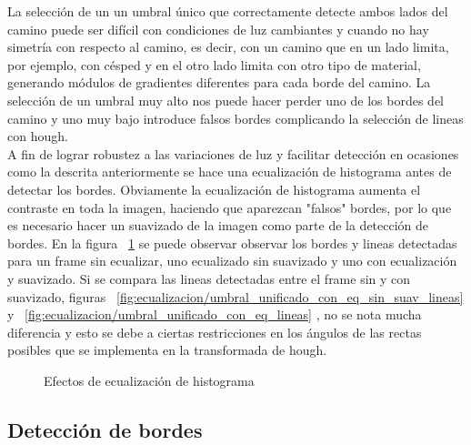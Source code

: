 \documentclass[a4paper,spanish]{article}
\begin{document}
	La selección de un un umbral único que correctamente detecte ambos lados del camino puede ser difícil con condiciones de luz cambiantes y cuando no hay simetría con respecto al camino, es decir, con un camino que en un lado limita, por ejemplo,  con césped y en el otro lado limita con otro tipo de material, generando módulos de gradientes diferentes para cada borde del camino. La selección de un umbral muy alto nos puede hacer perder uno de los bordes del camino y uno muy bajo introduce falsos bordes complicando la selección de lineas con hough. \\ 
	A fin de lograr robustez a las variaciones de luz y facilitar detección en ocasiones como la descrita anteriormente se hace una  ecualización de histograma antes de detectar los bordes.
    Obviamente la ecualización de histograma aumenta el contraste en toda la imagen, haciendo que aparezcan "falsos" bordes, por lo que es necesario hacer un suavizado de la imagen como parte de la detección de bordes. 
    En la figura ~\ref{fig:ecualizacion} se puede observar 
   observar los bordes y lineas detectadas para un frame sin ecualizar, uno ecualizado sin suavizado y uno con ecualización y suavizado. Si se compara las lineas detectadas entre el frame sin y con suavizado, figuras ~\ref{fig:ecualizacion/umbral_unificado_con_eq_sin_suav_lineas} y ~\ref{fig:ecualizacion/umbral_unificado_con_eq_lineas} , no se nota mucha diferencia y esto se debe a ciertas restricciones en los ángulos de las rectas posibles que se  implementa en la transformada de hough. 
    
\begin{figure}[H]
\caption{Efectos de ecualización de histograma}
\label{fig:ecualizacion}
\end{figure}

\subsection{Detección de bordes} \label{sec:bordes}
\end{document}
